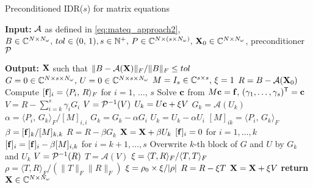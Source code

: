 \begin{algorithm}[ht] 
\caption{Preconditioned IDR($s$) for matrix equations \cite{ag15}}\label{bio_idr} \begin{algorithmic}[1]
 \State \parbox[t]{\dimexpr\linewidth-\algorithmicindent}{\textbf{Input:} ${\mathcal{A}}$ as defined in \eqref{eq:mateq_approach2}, $B \in {\mathbb{C}}^{N\times {N_{\omega}}},\,tol \in (0,\, 1), \\s\in\mathbb{N}^+,\, P\in {\mathbb{C}}^{N\times (s\times {N_{\omega}})},\, {\mathbf{X}}_0 \in {\mathbb{C}}^{N\times {N_{\omega}}}$, preconditioner ${\mathcal{P}}$ \strut} 
\State \textbf{Output:} ${\mathbf{X}}$ such that $\|B-{\mathcal{A}}({\mathbf{X}})\|_F/\|B\|_F\leq tol$ \vspace{0.2cm}
\State $G=0\in\mathbb{C}^{N\times s\times {N_{\omega}}},\, U=0\in{\mathbb{C}}^{N\times s\times {N_{\omega}}}$
\State $M=I_s\in{\mathbb{C}}^{s\times s},\, {\xi} = 1 $ %
\State $R = B - {\mathcal{A}}({\mathbf{X}}_0)$
    \State Compute $[\mathbf{f}]_i =   \langle P_i,\,R\rangle_F$ for $i=1,\,\dots,\,s$ 
    \State Solve $\mathbf{c}$ from $M\mathbf{c} = \mathbf{f}, \, (\gamma_1,\dots,\gamma_s)^\mathsf{T} = \mathbf{c}$ 
    \State $V = R - \sum_{i=k}^s \gamma_i G_i$ 
    \State $V = {\mathcal{P}}^{-1}(V)$ 
    \State $U_k = U\mathbf{c} + {\xi} V$ \State $G_k = \mathcal{A}(U_k) $  
        \State $\alpha = \langle {P}_i,\,{G}_k\rangle_F/[M]_{i,i}$ 
        \State ${G}_k = {G}_k - \alpha {G}_i $ 
        \State ${U}_k = {U}_k - \alpha {U}_i $ 
    \EndFor \State $[M]_{ik} = \langle P_i,\,{G}_k\rangle_F$%
    \State $\beta = [\mathbf{f}]_k/[M]_{k,k}$ 
    \State $R = R - \beta {G}_k$ \State ${\mathbf{X}} = {\mathbf{X}} + \beta {U}_k$ 
        \State $[\mathbf{f}]_i = 0$ for $i=1,\dots,k$ 
        \State $[\mathbf{f}]_i = [\mathbf{f}]_i - \beta [M]_{i,k}$ for $i=k+1,\dots,s$ 
    \EndIf 
    \State Overwrite $k$-th block of $G$ and $U$ by $G_k$ and $U_k$  
\EndFor 
\State $V = {\mathcal{P}}^{-1}(R)$ 
\State $T=\mathcal{A}(V)$ 
\State ${\xi} = \langle T, R \rangle_F/\langle T, T \rangle_F$
\State $\rho =\langle T, R \rangle_F/(\|T\|_F\|R\|_F)$
 
    \State ${\xi} = \rho_0 \times {\xi}/|\rho|$ 
\EndIf
\State $R = R - {\xi} T$ 
\State ${\mathbf{X}} = {\mathbf{X}} + {\xi} V$
    \EndWhile 
\State \textbf{return} ${\mathbf{X}} \in {\mathbb{C}}^{N \times {N_{\omega}}}$ 
\EndProcedure 
\end{algorithmic}
\end{algorithm} 